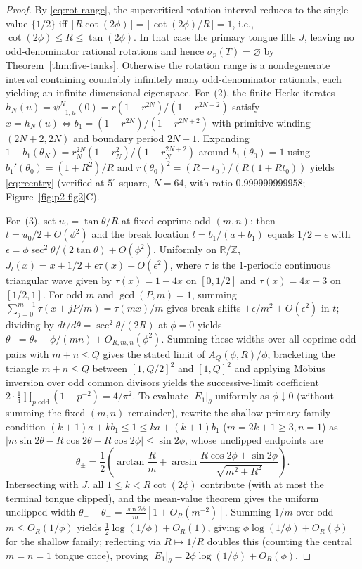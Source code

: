 \documentclass[11pt,reqno]{amsart}
\theoremstyle{definition}
\theoremstyle{remark}
\newcommand{\R}{\mathbb{R}}
\newcommand{\Z}{\mathbb{Z}}
\begin{document}
\begin{proof}
By \eqref{eq:rot-range}, the supercritical rotation interval reduces to the single value $\{1/2\}$ iff $\lceil R\cot(2\phi) \rceil = \lceil \cot(2\phi)/R \rceil = 1$, i.e., $\cot(2\phi) \le R \le \tan(2\phi)$. In that case the primary tongue fills $J$, leaving no odd-denominator rational rotations and hence $\sigma_p(T) = \varnothing$ by Theorem~\ref{thm:five-tanks}. Otherwise the rotation range is a nondegenerate interval containing countably infinitely many odd-denominator rationals, each yielding an infinite-dimensional eigenspace. For~(2), the finite Hecke iterates $h_N(u) = \psi_{-1,u}^N(0) = r(1-r^{2N})/(1-r^{2N+2})$ satisfy $x = h_N(u) \iff b_1 = (1-r^{2N})/(1-r^{2N+2})$ with primitive winding $(2N+2, 2N)$ and boundary period $2N+1$. Expanding $1 - b_1(\theta_N) = r_N^{2N}(1-r_N^2)/(1-r_N^{2N+2})$ around $b_1(\theta_0) = 1$ using $b_1'(\theta_0) = (1+R^2)/R$ and $r(\theta_0)^2 = (R - t_0)/(R(1 + R t_0))$ yields \eqref{eq:reentry} (verified at $5^\circ$ square, $N = 64$, with ratio $0.999999999958$; Figure~\ref{fig:p2-fig2}C).

For~(3), set $u_0 = \tan\theta/R$ at fixed coprime odd $(m,n)$; then $t = u_0/2 + O(\phi^2)$ and the break location $l = b_1/(a+b_1)$ equals $1/2 + \epsilon$ with $\epsilon = \phi\sec^2\theta/(2\tan\theta) + O(\phi^2)$. Uniformly on $\R/\Z$, $J_l(x) = x + 1/2 + \epsilon\tau(x) + O(\epsilon^2)$, where $\tau$ is the $1$-periodic continuous triangular wave given by $\tau(x) = 1 - 4x$ on $[0,1/2]$ and $\tau(x) = 4x - 3$ on $[1/2,1]$. For odd $m$ and $\gcd(P,m)=1$, summing $\sum_{j=0}^{m-1}\tau(x + jP/m) = \tau(mx)/m$ gives break shifts $\pm\epsilon/m^2 + O(\epsilon^2)$ in $t$; dividing by $dt/d\theta = \sec^2\theta/(2R)$ at $\phi = 0$ yields $\theta_\pm = \theta_* \pm \phi/(mn) + O_{R,m,n}(\phi^2)$. Summing these widths over all coprime odd pairs with $m + n \le Q$ gives the stated limit of $A_Q(\phi, R)/\phi$; bracketing the triangle $m + n \le Q$ between $[1, Q/2]^2$ and $[1, Q]^2$ and applying M\"obius inversion over odd common divisors yields the successive-limit coefficient $2 \cdot \frac{1}{4}\prod_{p\text{ odd}}(1 - p^{-2}) = 4/\pi^2$. To evaluate $|E_1|_\theta$ uniformly as $\phi \downarrow 0$ (without summing the fixed-$(m,n)$ remainder), rewrite the shallow primary-family condition $(k+1)a + kb_1 \le 1 \le ka + (k+1)b_1$ ($m = 2k+1 \ge 3, n = 1$) as $|m\sin 2\theta - R\cos 2\theta - R\cos 2\phi| \le \sin 2\phi$, whose unclipped endpoints are
\[
  \theta_\pm = \frac{1}{2}\left(\arctan\frac{R}{m} + \arcsin\frac{R\cos 2\phi \pm \sin 2\phi}{\sqrt{m^2 + R^2}}\right).
\]
Intersecting with $J$, all $1 \le k < R\cot(2\phi)$ contribute (with at most the terminal tongue clipped), and the mean-value theorem gives the uniform unclipped width $\theta_+ - \theta_- = \frac{\sin 2\phi}{m}[1 + O_R(m^{-2})]$. Summing $1/m$ over odd $m \le O_R(1/\phi)$ yields $\frac{1}{2}\log(1/\phi) + O_R(1)$, giving $\phi\log(1/\phi) + O_R(\phi)$ for the shallow family; reflecting via $R \mapsto 1/R$ doubles this (counting the central $m=n=1$ tongue once), proving $|E_1|_\theta = 2\phi\log(1/\phi) + O_R(\phi)$.
\end{proof}
\end{document}

